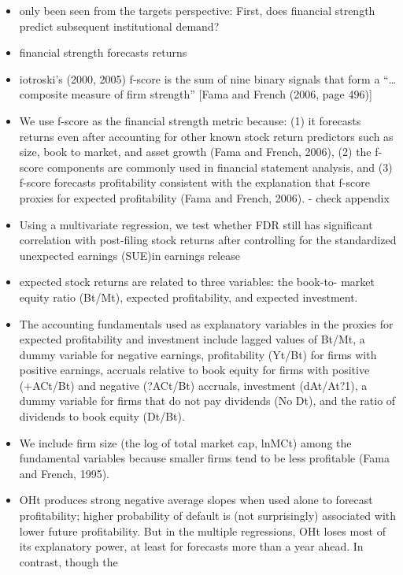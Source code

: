 \documentclass[12pt]{article}
\begin{document}
\begin{itemize}
        \item only been seen from the targets perspective: First, does financial strength predict
        subsequent institutional demand? \citep{Choi2012}
        \item financial strength forecasts returns \citep{Choi2012}
        \item iotroski’s (2000, 2005) f-score is the sum of nine binary signals that form a “…composite measure of firm strength” [Fama and French (2006, page 496)] \citep{Choi2012}
        \item We use f-score as the financial strength metric because: (1) it forecasts returns even after accounting for other known stock return predictors such as size, book to market, and asset growth (Fama and French, 2006), (2) the f-score components are commonly used in financial statement analysis, and (3) f-score forecasts profitability consistent with the explanation that f-score proxies for expected profitability (Fama and French, 2006).\citep{Choi2012} - check appendix 
        \item Using a multivariate regression, we test whether FDR still has significant correlation with post-filing stock returns after controlling for the standardized unexpected earnings (SUE)in earnings release \citep{You2009}
        \item expected stock returns are related to three variables: the book-to-
        market equity ratio (Bt/Mt), expected profitability, and expected investment.\citep{Fama2006}
        \item The accounting fundamentals used as explanatory variables in the proxies for expected profitability and investment include lagged values of Bt/Mt, a dummy variable for negative earnings, profitability (Yt/Bt) for firms with positive earnings, accruals relative to book
        equity for firms with positive (+ACt/Bt) and negative (?ACt/Bt) accruals, investment (dAt/At?1), a dummy variable for firms that do not pay dividends (No Dt), and the ratio of dividends to book equity (Dt/Bt).\citep{Fama2006}
        \item We include firm size (the log of total market cap, lnMCt) among the fundamental variables because smaller firms tend to be less profitable (Fama and French, 1995).\citep{Fama2006}
        \item OHt produces strong negative average slopes when used alone to forecast profitability; higher probability of default is (not surprisingly) associated
        with lower future profitability. But in the multiple regressions, OHt loses most of its explanatory power, at least for forecasts more than a year ahead. In contrast, though the

\end{itemize}
\end{document}
